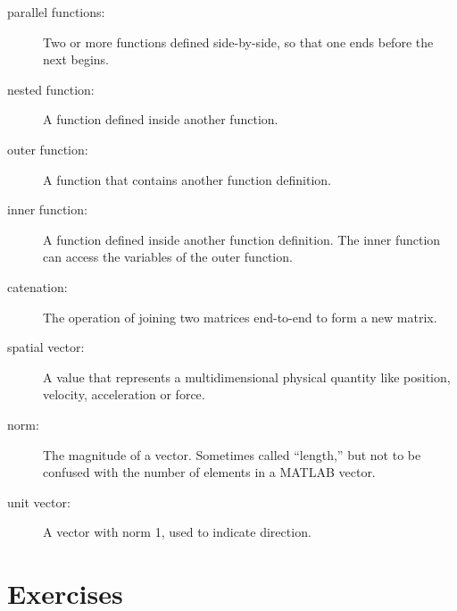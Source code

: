 \documentclass{book}
\begin{document}
\begin{description}

\item[parallel functions:] Two or more functions defined side-by-side,
so that one ends before the next begins.

\item[nested function:] A function defined inside another function.

\item[outer function:] A function that contains another function
definition.

\item[inner function:] A function defined inside another function
definition.  The inner function can access the variables of the
outer function.

\item[catenation:] The operation of joining two matrices end-to-end to
form a new matrix.

\item[spatial vector:] A value that represents a
multidimensional physical quantity like position, velocity,
acceleration or force.

\item[norm:] The magnitude of a vector.  Sometimes called ``length,''
but not to be confused with the number of elements in a MATLAB
vector.

\item[unit vector:] A vector with norm 1, used to indicate
direction.


\end{description}

\section{Exercises}
\end{document}
